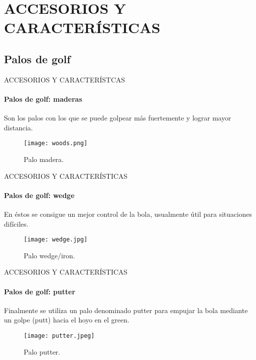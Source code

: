 \section{ACCESORIOS Y CARACTERÍSTICAS}
\subsection{Palos de golf}
\begin{frame}{ACCESORIOS Y CARACTERÍSTCAS}
\framesubtitle{Palos de golf: maderas}
	Son los palos con los que se puede golpear más fuertemente y lograr mayor distancia.
	\begin{figure}[H]
      \centering
      \texttt{[image: woods.png]}
      \caption{Palo madera\footnotemark{}.}
	\end{figure}
\end{frame}
\begin{frame}{ACCESORIOS Y CARACTERÍSTICAS}
\framesubtitle{Palos de golf: wedge}
En éstos se consigue un mejor control de la bola, usualmente útil para situaciones difíciles.
	\begin{figure}[H]
      \centering
      \texttt{[image: wedge.jpg]}
      \caption{Palo wedge/iron\footnotemark{}.}
	\end{figure}
\vspace{-2cm}
\end{frame}

\begin{frame}{ACCESORIOS Y CARACTERÍSTICAS}
\framesubtitle{Palos de golf: putter}
Finalmente se utiliza un palo denominado putter para empujar la bola mediante un golpe (putt) hacia el hoyo en el green.
	\begin{figure}[H]
      \centering
      \texttt{[image: putter.jpeg]}
      \caption{Palo putter\footnotemark{}.}
	\end{figure}
	\vspace{-1cm}
\end{frame}
